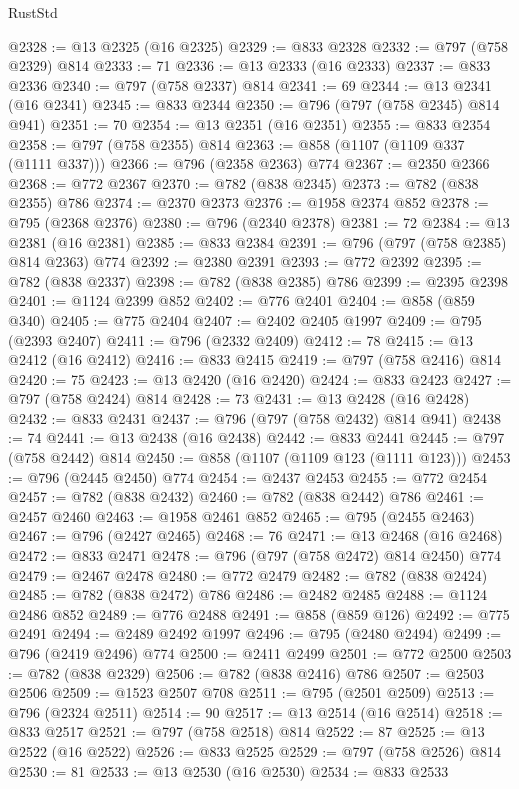 \begin{lexlean}{RustStd}
\begin{coremodule}
@2328 := @13 @2325 (@16 @2325)
@2329 := @833 @2328
@2332 := @797 (@758 @2329) @814
@2333 := 71
@2336 := @13 @2333 (@16 @2333)
@2337 := @833 @2336
@2340 := @797 (@758 @2337) @814
@2341 := 69
@2344 := @13 @2341 (@16 @2341)
@2345 := @833 @2344
@2350 := @796 (@797 (@758 @2345) @814 @941)
@2351 := 70
@2354 := @13 @2351 (@16 @2351)
@2355 := @833 @2354
@2358 := @797 (@758 @2355) @814
@2363 := @858 (@1107 (@1109 @337 (@1111 @337)))
@2366 := @796 (@2358 @2363) @774
@2367 := @2350 @2366
@2368 := @772 @2367
@2370 := @782 (@838 @2345)
@2373 := @782 (@838 @2355) @786
@2374 := @2370 @2373
@2376 := @1958 @2374 @852
@2378 := @795 (@2368 @2376)
@2380 := @796 (@2340 @2378)
@2381 := 72
@2384 := @13 @2381 (@16 @2381)
@2385 := @833 @2384
@2391 := @796 (@797 (@758 @2385) @814 @2363) @774
@2392 := @2380 @2391
@2393 := @772 @2392
@2395 := @782 (@838 @2337)
@2398 := @782 (@838 @2385) @786
@2399 := @2395 @2398
@2401 := @1124 @2399 @852
@2402 := @776 @2401
@2404 := @858 (@859 @340)
@2405 := @775 @2404
@2407 := @2402 @2405 @1997
@2409 := @795 (@2393 @2407)
@2411 := @796 (@2332 @2409)
@2412 := 78
@2415 := @13 @2412 (@16 @2412)
@2416 := @833 @2415
@2419 := @797 (@758 @2416) @814
@2420 := 75
@2423 := @13 @2420 (@16 @2420)
@2424 := @833 @2423
@2427 := @797 (@758 @2424) @814
@2428 := 73
@2431 := @13 @2428 (@16 @2428)
@2432 := @833 @2431
@2437 := @796 (@797 (@758 @2432) @814 @941)
@2438 := 74
@2441 := @13 @2438 (@16 @2438)
@2442 := @833 @2441
@2445 := @797 (@758 @2442) @814
@2450 := @858 (@1107 (@1109 @123 (@1111 @123)))
@2453 := @796 (@2445 @2450) @774
@2454 := @2437 @2453
@2455 := @772 @2454
@2457 := @782 (@838 @2432)
@2460 := @782 (@838 @2442) @786
@2461 := @2457 @2460
@2463 := @1958 @2461 @852
@2465 := @795 (@2455 @2463)
@2467 := @796 (@2427 @2465)
@2468 := 76
@2471 := @13 @2468 (@16 @2468)
@2472 := @833 @2471
@2478 := @796 (@797 (@758 @2472) @814 @2450) @774
@2479 := @2467 @2478
@2480 := @772 @2479
@2482 := @782 (@838 @2424)
@2485 := @782 (@838 @2472) @786
@2486 := @2482 @2485
@2488 := @1124 @2486 @852
@2489 := @776 @2488
@2491 := @858 (@859 @126)
@2492 := @775 @2491
@2494 := @2489 @2492 @1997
@2496 := @795 (@2480 @2494)
@2499 := @796 (@2419 @2496) @774
@2500 := @2411 @2499
@2501 := @772 @2500
@2503 := @782 (@838 @2329)
@2506 := @782 (@838 @2416) @786
@2507 := @2503 @2506
@2509 := @1523 @2507 @708
@2511 := @795 (@2501 @2509)
@2513 := @796 (@2324 @2511)
@2514 := 90
@2517 := @13 @2514 (@16 @2514)
@2518 := @833 @2517
@2521 := @797 (@758 @2518) @814
@2522 := 87
@2525 := @13 @2522 (@16 @2522)
@2526 := @833 @2525
@2529 := @797 (@758 @2526) @814
@2530 := 81
@2533 := @13 @2530 (@16 @2530)
@2534 := @833 @2533

\end{coremodule}
\end{lexlean}
